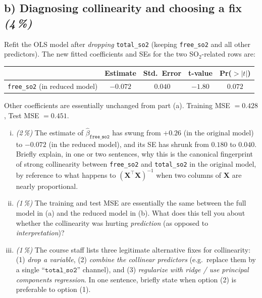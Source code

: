 \documentclass[11pt,a4paper]{article}
\newcommand{\subpoints}[1]{\textit{(#1\,\%)}}
\begin{document}
\subsection*{b) Diagnosing collinearity and choosing a fix \subpoints{4}}

Refit the OLS model after \emph{dropping} \texttt{total\_so2} (keeping \texttt{free\_so2} and all other predictors). The new fitted coefficients and SEs for the two SO$_2$-related rows are:

\begin{center}\small
\begin{tabular}{lcccc}
\toprule
 & \textbf{Estimate} & \textbf{Std.\ Error} & \textbf{t-value} & \textbf{Pr($>|t|$)} \\
\midrule
\texttt{free\_so2} (in reduced model)       & $-0.072$  & $0.040$ & $-1.80$ & $0.072$ \\
\bottomrule
\end{tabular}
\end{center}

Other coefficients are essentially unchanged from part (a). Training MSE $= 0.428$, \quad Test MSE $= 0.451$.

\begin{enumerate}[(i)]
  \item \subpoints{2} The estimate of $\hat\beta_{\texttt{free\_so2}}$ has swung from $+0.26$ (in the original model) to $-0.072$ (in the reduced model), and its SE has shrunk from $0.180$ to $0.040$. Briefly explain, in one or two sentences, why this is the canonical fingerprint of strong collinearity between \texttt{free\_so2} and \texttt{total\_so2} in the original model, by reference to what happens to $(\mathbf{X}^\top\mathbf{X})^{-1}$ when two columns of $\mathbf{X}$ are nearly proportional.

  \item \subpoints{1} The training and test MSE are essentially the same between the full model in (a) and the reduced model in (b). What does this tell you about whether the collinearity was hurting \emph{prediction} (as opposed to \emph{interpretation})?

  \item \subpoints{1} The course staff lists three legitimate alternative fixes for collinearity: (1) \emph{drop a variable}, (2) \emph{combine the collinear predictors} (e.g.\ replace them by a single ``$\texttt{total\_so2}$'' channel), and (3) \emph{regularize with ridge / use principal components regression}. In one sentence, briefly state when option (2) is preferable to option (1).
\end{enumerate}
\end{document}
